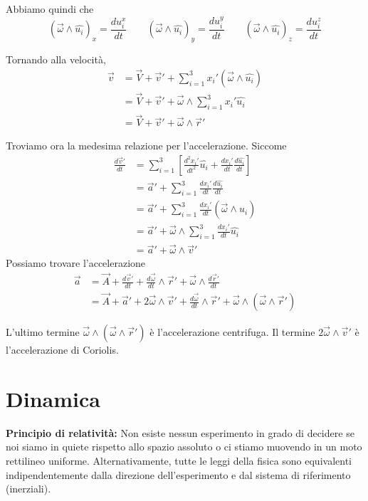 \documentclass[a4paper]{article}
\begin{document}
Abbiamo quindi che
\[
    (\vec{\omega} \wedge \hat{u_i})_x = \frac{du_i^x}{dt}
    \qquad
    (\vec{\omega} \wedge \hat{u_i})_y = \frac{du_i^y}{dt}
    \qquad
    (\vec{\omega} \wedge \hat{u_i})_z = \frac{du_i^z}{dt}
\]

Tornando alla velocità,
\begin{align*}
    \vec{v} &= \vec{V} + \vec{v}' + \sum_{i=1}^3 x_i' (\vec{\omega} \wedge \hat{u_i}) \\
    &= \vec{V} + \vec{v}' + \vec{\omega} \wedge \sum_{i=1}^3 x_i' \hat{u_i} \\
    &= \vec{V} + \vec{v}' + \vec{\omega} \wedge \vec{r}'
\end{align*}

Troviamo ora la medesima relazione per l'accelerazione.
Siccome
\begin{align*}
    \frac{d\vec{v}'}{dt} &= \sum_{i=1}^3 \left[
        \frac{d^2 x_i'}{dt^2} \hat{u_i} + \frac{dx_i'}{dt} \frac{d\hat{u_i}}{dt}
    \right] \\
    &= \vec{a}' + \sum_{i=1}^3 \frac{dx_i'}{dt} \frac{d\hat{u_i}}{dt} \\
    &= \vec{a}' + \sum_{i=1}^3 \frac{dx_i'}{dt} (\vec{\omega} \wedge \hat{u_i}) \\
    &= \vec{a}' + \vec{\omega} \wedge \sum_{i=1}^3 \frac{dx_i'}{dt} \hat{u_i} \\
    &= \vec{a}' + \vec{\omega} \wedge \vec{v}'
\end{align*}
Possiamo trovare l'accelerazione
\begin{align*}
    \vec{a} &= \vec{A} + \frac{d\vec{v}'}{dt} + \frac{d\vec{\omega}}{dt} \wedge \vec{r}'
    + \vec{\omega} \wedge \frac{d\vec{r}'}{dt} \\
    &= \vec{A} + \vec{a}' + 2 \vec{\omega} \wedge \vec{v}' + \frac{d\vec{\omega}}{dt} \wedge \vec{r}'
    + \vec{\omega} \wedge (\vec{\omega} \wedge \vec{r}')
\end{align*}

L'ultimo termine \(\vec{\omega} \wedge (\vec{\omega} \wedge \vec{r}')\) è l'accelerazione centrifuga.
Il termine \(2 \vec{\omega} \wedge \vec{v}'\) è l'accelerazione di Coriolis.

\pagebreak

\section{Dinamica}

\textbf{Principio di relatività:}
Non esiste nessun esperimento in grado di decidere se noi siamo in quiete rispetto allo spazio assoluto
o ci stiamo muovendo in un moto rettilineo uniforme. Alternativamente, tutte le leggi della fisica sono equivalenti
indipendentemente dalla direzione dell'esperimento e dal sistema di riferimento (inerziali).
\end{document}
